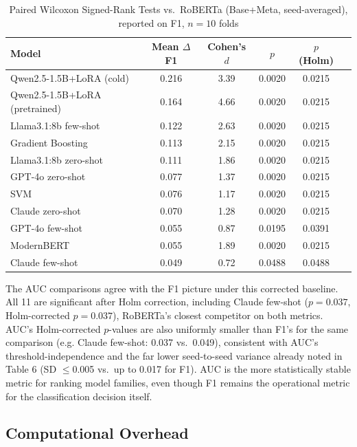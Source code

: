 \documentclass[preprint,12pt]{elsarticle}
\begin{document}
\begin{table}[t]
\centering
\label{tab:significance}
\footnotesize
\setlength{\tabcolsep}{3pt}
\begin{tabular}{lccccc}
\toprule
\textbf{Model} & \textbf{Mean $\Delta$F1} & \textbf{Cohen's $d$} & \textbf{$p$} & \textbf{$p$ (Holm)} \\
\midrule
Qwen2.5-1.5B+LoRA (cold) & 0.216 & 3.39 & 0.0020 & 0.0215 \\
Qwen2.5-1.5B+LoRA (pretrained) & 0.164 & 4.66 & 0.0020 & 0.0215 \\
Llama3.1:8b few-shot & 0.122 & 2.63 & 0.0020 & 0.0215 \\
Gradient Boosting & 0.113 & 2.15 & 0.0020 & 0.0215 \\
Llama3.1:8b zero-shot & 0.111 & 1.86 & 0.0020 & 0.0215 \\
GPT-4o zero-shot & 0.077 & 1.37 & 0.0020 & 0.0215 \\
SVM & 0.076 & 1.17 & 0.0020 & 0.0215 \\
Claude zero-shot & 0.070 & 1.28 & 0.0020 & 0.0215 \\
GPT-4o few-shot & 0.055 & 0.87 & 0.0195 & 0.0391 \\
ModernBERT & 0.055 & 1.89 & 0.0020 & 0.0215 \\
Claude few-shot & 0.049 & 0.72 & 0.0488 & 0.0488 \\
\bottomrule
\end{tabular}
\caption{Paired Wilcoxon Signed-Rank Tests vs.\ RoBERTa (Base+Meta, seed-averaged), reported on F1, $n=10$ folds}
\end{table}

The AUC comparisons agree with the F1 picture under this corrected baseline. All 11 are significant after Holm correction, including Claude few-shot ($p=0.037$, Holm-corrected $p=0.037$), RoBERTa's closest competitor on both metrics. AUC's Holm-corrected $p$-values are also uniformly smaller than F1's for the same comparison (e.g. Claude few-shot: 0.037 vs.\ 0.049), consistent with AUC's threshold-independence and the far lower seed-to-seed variance already noted in Table 6 (SD $\le$0.005 vs.\ up to 0.017 for F1). AUC is the more statistically stable metric for ranking model families, even though F1 remains the operational metric for the classification decision itself.

\subsection{Computational Overhead}
\label{sec:overhead}
\end{document}
